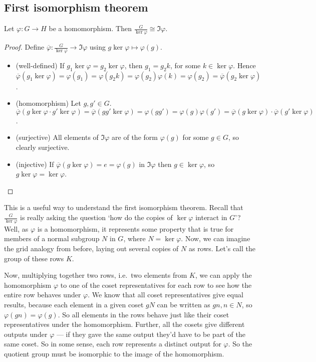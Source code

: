 \subsection{First isomorphism theorem}
\begin{theorem}
	Let \(\varphi: G \to H\) be a homomorphism.
	Then \(\frac{G}{\ker \varphi} \cong \Im \varphi\).
\end{theorem}
\begin{proof}
	Define \(\overline \varphi: \frac{G}{\ker \varphi} \to \Im \varphi\) using \(g \ker \varphi \mapsto \varphi(g)\).
	\begin{itemize}
		\item (well-defined) If \(g_1 \ker \varphi = g_2 \ker \varphi\), then \(g_1 = g_2k\), for some \(k \in \ker \varphi\).
		      Hence \(\overline\varphi(g_1 \ker \varphi) = \varphi(g_1) = \varphi(g_2k) = \varphi(g_2)\varphi(k) = \varphi(g_2) = \overline\varphi(g_2 \ker \varphi)\).
		\item (homomorphism) Let \(g, g' \in G\).
		      \(\overline\varphi(g \ker \varphi \cdot g' \ker \varphi) = \overline\varphi(gg' \ker \varphi) = \varphi(gg') = \varphi(g)\varphi(g') = \overline\varphi(g\ker\varphi) \cdot \overline\varphi(g'\ker\varphi)\).
		\item (surjective) All elements of \(\Im \varphi\) are of the form \(\varphi(g)\) for some \(g \in G\), so clearly surjective.
		\item (injective) If \(\overline\varphi(g \ker \varphi) = e = \varphi(g)\) in \(\Im \varphi\) then \(g \in \ker \varphi\), so \(g \ker \varphi = \ker \varphi\).
	\end{itemize}
\end{proof}
This is a useful way to understand the first isomorphism theorem.
Recall that \(\frac{G}{\ker \varphi}\) is really asking the question `how do the copies of \(\ker \varphi\) interact in \(G\)'?
Well, as \(\varphi\) is a homomorphism, it represents some property that is true for members of a normal subgroup \(N\) in \(G\), where \(N = \ker \varphi\).
Now, we can imagine the grid analogy from before, laying out several copies of \(N\) as rows.
Let's call the group of these rows \(K\).

Now, multiplying together two rows, i.e.\ two elements from \(K\), we can apply the homomorphism \(\varphi\) to one of the coset representatives for each row to see how the entire row behaves under \(\varphi\).
We know that all coset representatives give equal results, because each element in a given coset \(gN\) can be written as \(gn, n \in N\), so \(\varphi(gn) = \varphi(g)\).
So all elements in the rows behave just like their coset representatives under the homomorphism.
Further, all the cosets give different outputs under \(\varphi\) --- if they gave the same output they'd have to be part of the same coset.
So in some sense, each row represents a distinct output for \(\varphi\).
So the quotient group must be isomorphic to the image of the homomorphism.

